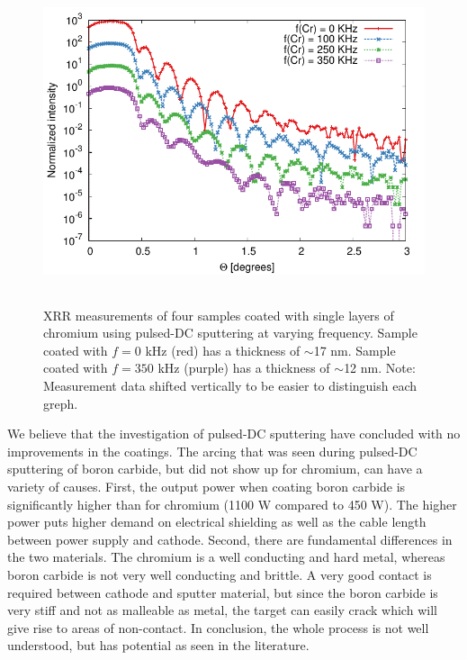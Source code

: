 \begin{figure}[!h]
	\center
	\includegraphics[height=9.5cm]{figures/athena/coatings/cr_pulsed_2.pdf}
\caption{\footnotesize XRR measurements of four samples coated with single layers of chromium using pulsed-DC sputtering at varying frequency. Sample coated with $f=0$ kHz (red) has a thickness of $\sim$17 nm. Sample coated with $f=350$ kHz (purple) has a thickness of $\sim$12 nm. Note: Measurement data shifted vertically to be easier to distinguish each greph.}\label{fig:cr-pulsed}
\end{figure}

We believe that the investigation of pulsed-DC sputtering have concluded with no improvements in the coatings. The arcing that was seen during pulsed-DC sputtering of boron carbide, but did not show up for chromium, can have a variety of causes. First, the output power when coating boron carbide is significantly higher than for chromium (1100 W compared to 450 W). The higher power puts higher demand on electrical shielding as well as the cable length between power supply and cathode. Second, there are fundamental differences in the two materials. The chromium is a well conducting and hard metal, whereas boron carbide is not very well conducting and brittle. A very good contact is required between cathode and sputter material, but since the boron carbide is very stiff and not as malleable as metal, the target can easily crack which will give rise to areas of non-contact. In conclusion, the whole process is not well understood, but has potential as seen in the literature.

